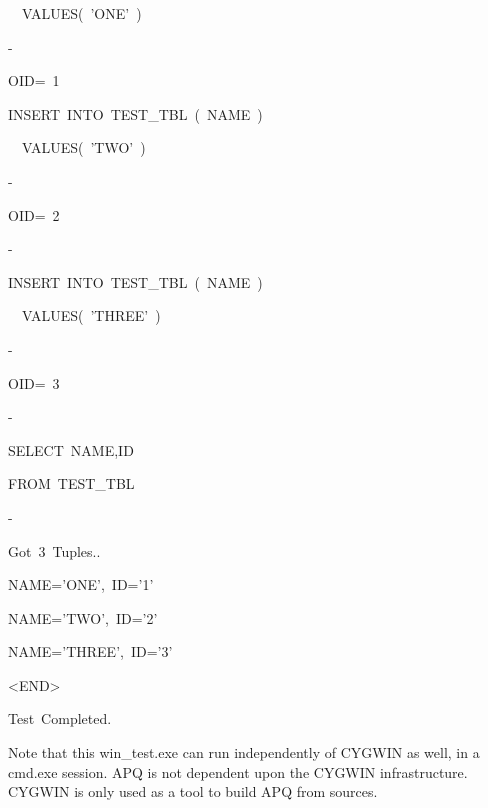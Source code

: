\documentclass[english]{report}
\newenvironment{lyxcode}
   {\begin{list}{}{
     \setlength{\rightmargin}{\leftmargin}
     \setlength{\listparindent}{0pt}%
     \raggedright
     \setlength{\itemsep}{0pt}
     \setlength{\parsep}{0pt}
     \normalfont\ttfamily}%
    \item[]}
   {\end{list}}
\begin{document}
\begin{lyxcode}
~{\footnotesize ~VALUES(~'ONE'~)}{\footnotesize \par}

-

{\footnotesize OID=~1}{\footnotesize \par}



{\footnotesize INSERT~INTO~TEST\_TBL~(~NAME~)}{\footnotesize \par}

~{\footnotesize ~VALUES(~'TWO'~)}{\footnotesize \par}

-

{\footnotesize OID=~2}{\footnotesize \par}

-

{\footnotesize INSERT~INTO~TEST\_TBL~(~NAME~)}{\footnotesize \par}

~{\footnotesize ~VALUES(~'THREE'~)}{\footnotesize \par}

-

{\footnotesize OID=~3}{\footnotesize \par}

-

{\footnotesize SELECT~NAME,ID}{\footnotesize \par}

{\footnotesize FROM~TEST\_TBL}{\footnotesize \par}

-

{\footnotesize Got~3~Tuples..}{\footnotesize \par}

{\footnotesize NAME='ONE',~ID='1'}{\footnotesize \par}

{\footnotesize NAME='TWO',~ID='2'}{\footnotesize \par}

{\footnotesize NAME='THREE',~ID='3'}{\footnotesize \par}

{\footnotesize <END>}{\footnotesize \par}

{\footnotesize Test~Completed.}{\footnotesize \par}
\end{lyxcode}
Note that this win\_test.exe can run independently of CYGWIN as well,
in a cmd.exe session. APQ is not dependent upon the CYGWIN infrastructure.
CYGWIN is only used as a tool to build APQ from sources.
\end{document}
